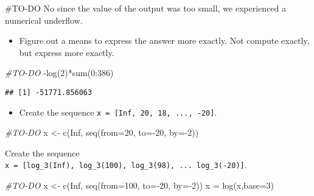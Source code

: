 \documentclass[
]{article}
\newenvironment{Shaded}{\begin{snugshade}}{\end{snugshade}}
\newcommand{\AttributeTok}[1]{\textcolor[rgb]{0.77,0.63,0.00}{#1}}
\newcommand{\CommentTok}[1]{\textcolor[rgb]{0.56,0.35,0.01}{\textit{#1}}}
\newcommand{\ConstantTok}[1]{\textcolor[rgb]{0.00,0.00,0.00}{#1}}
\newcommand{\DecValTok}[1]{\textcolor[rgb]{0.00,0.00,0.81}{#1}}
\newcommand{\FunctionTok}[1]{\textcolor[rgb]{0.00,0.00,0.00}{#1}}
\newcommand{\NormalTok}[1]{#1}
\newcommand{\OtherTok}[1]{\textcolor[rgb]{0.56,0.35,0.01}{#1}}
\newcommand{\SpecialCharTok}[1]{\textcolor[rgb]{0.00,0.00,0.00}{#1}}
\providecommand{\tightlist}{%
  \setlength{\itemsep}{0pt}\setlength{\parskip}{0pt}}
\begin{document}
\#TO-DO No since the value of the output was too small, we experienced a
numerical underflow.

\begin{itemize}
\tightlist
\item
  Figure out a means to express the answer more exactly. Not compute
  exactly, but express more exactly.
\end{itemize}

\begin{Shaded}
\begin{Highlighting}[]
\CommentTok{\#TO{-}DO}
\SpecialCharTok{{-}}\FunctionTok{log}\NormalTok{(}\DecValTok{2}\NormalTok{)}\SpecialCharTok{*}\FunctionTok{sum}\NormalTok{(}\DecValTok{0}\SpecialCharTok{:}\DecValTok{386}\NormalTok{)}
\end{Highlighting}
\end{Shaded}

\begin{verbatim}
## [1] -51771.856063
\end{verbatim}

\begin{itemize}
\tightlist
\item
  Create the sequence \texttt{x\ =\ {[}Inf,\ 20,\ 18,\ ...,\ -20{]}}.
\end{itemize}

\begin{Shaded}
\begin{Highlighting}[]
\CommentTok{\#TO{-}DO}
\NormalTok{x }\OtherTok{\textless{}{-}} \FunctionTok{c}\NormalTok{(}\ConstantTok{Inf}\NormalTok{, }\FunctionTok{seq}\NormalTok{(}\AttributeTok{from=}\DecValTok{20}\NormalTok{, }\AttributeTok{to=}\SpecialCharTok{{-}}\DecValTok{20}\NormalTok{, }\AttributeTok{by=}\SpecialCharTok{{-}}\DecValTok{2}\NormalTok{))}
\end{Highlighting}
\end{Shaded}

Create the sequence
\texttt{x\ =\ {[}log\_3(Inf),\ log\_3(100),\ log\_3(98),\ ...\ log\_3(-20){]}}.

\begin{Shaded}
\begin{Highlighting}[]
\CommentTok{\#TO{-}DO}
\NormalTok{x }\OtherTok{\textless{}{-}} \FunctionTok{c}\NormalTok{(}\ConstantTok{Inf}\NormalTok{, }\FunctionTok{seq}\NormalTok{(}\AttributeTok{from=}\DecValTok{100}\NormalTok{, }\AttributeTok{to=}\SpecialCharTok{{-}}\DecValTok{20}\NormalTok{, }\AttributeTok{by=}\SpecialCharTok{{-}}\DecValTok{2}\NormalTok{))}
\NormalTok{x }\OtherTok{=} \FunctionTok{log}\NormalTok{(x,}\AttributeTok{base=}\DecValTok{3}\NormalTok{)}
\end{Highlighting}
\end{Shaded}
\end{document}
